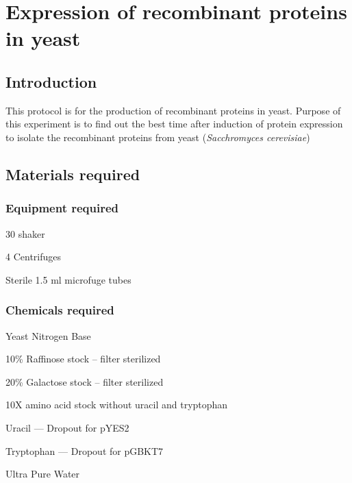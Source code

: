 \chapter{Expression of recombinant proteins in yeast}
\newpage
\setlength{\parindent}{0pt}
\setcounter{secnumdepth}{5}
\setcounter{section}{0}
\renewcommand*{\theHsection}{exp.\the\value{section}}
\section{Introduction}
This protocol is for the production of recombinant proteins in yeast. Purpose of this experiment is to find out the best time after induction of protein expression to isolate the recombinant proteins from yeast (\textit{Sacchromyces cerevisiae})
\section{Materials required}

		\subsection{Equipment required}
			\begin{packed_enum}
				\item 30 {\textcelsius} shaker
				\item 4 {\textcelsius} Centrifuges
				\item Sterile 1.5 ml microfuge tubes
			\end{packed_enum}
 
		\subsection{Chemicals required}
			\begin{packed_enum}
			\item Yeast Nitrogen Base
			\item 10\% Raffinose stock -- filter sterilized
			\item 20\% Galactose stock -- filter sterilized
			\item 10X amino acid stock without uracil and tryptophan
			\item Uracil --- Dropout for pYES2
			\item Tryptophan --- Dropout for pGBKT7
			\item Ultra Pure Water
			\end{packed_enum}
